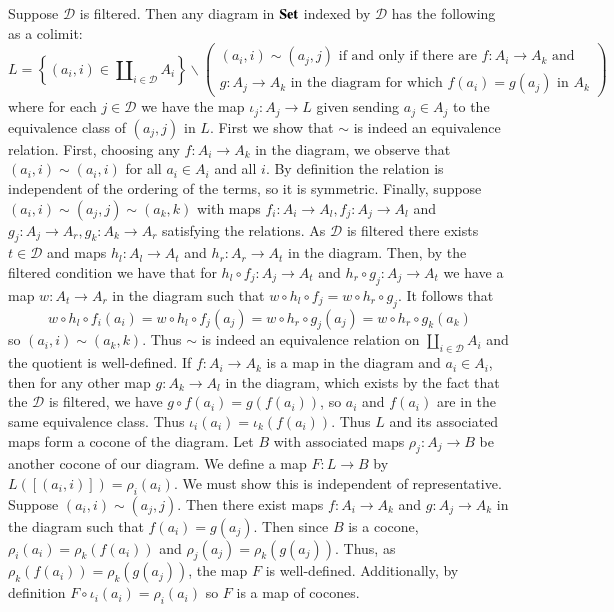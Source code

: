 \begin{example}
    Suppose $\mathscr{D}$ is filtered. Then any diagram in $\normalfont\textbf{Set}$ indexed by $\mathscr{D}$ has the following as a colimit: \begin{equation*}
        L = \left\{(a_i,i) \in \amalg_{i \in \mathscr{D}}A_i\right\}\backslash\left(\begin{array}{c} (a_i,i)\sim (a_j,j)\text{ if and only if there are } f:A_i\rightarrow A_k \text{ and } \\ g:A_j\rightarrow A_k\text{ in the diagram for which $f(a_i) = g(a_j)$ in $A_k$}\end{array}\right)
    \end{equation*}
    where for each $j \in \mathscr{D}$ we have the map $\iota_j:A_j\rightarrow L$ given sending $a_j \in A_j$ to the equivalence class of $(a_j,j)$ in $L$. First we show that $\sim$ is indeed an equivalence relation. First, choosing any $f:A_i\rightarrow A_k$ in the diagram, we observe that $(a_i,i) \sim (a_i,i)$ for all $a_i \in A_i$ and all $i$. By definition the relation is independent of the ordering of the terms, so it is symmetric. Finally, suppose $(a_i,i)\sim(a_j,j)\sim(a_k,k)$ with maps $f_i:A_i\rightarrow A_l,f_j:A_j\rightarrow A_l$ and $g_j:A_j\rightarrow A_r,g_k:A_k\rightarrow A_r$ satisfying the relations. As $\mathscr{D}$ is filtered there exists $t \in \mathscr{D}$ and maps $h_l:A_l\rightarrow A_t$ and $h_r:A_r\rightarrow A_t$ in the diagram. Then, by the filtered condition we have that for $h_l\circ f_j:A_j\rightarrow A_t$ and $h_r\circ g_j:A_j\rightarrow A_t$ we have a map $w:A_t\rightarrow A_r$ in the diagram such that $w\circ h_l\circ f_j = w\circ h_r\circ g_j$. It follows that \begin{equation*}
        w\circ h_l\circ f_i(a_i) = w\circ h_l\circ f_j(a_j) = w\circ h_r\circ g_j(a_j) = w\circ h_r\circ g_k(a_k)
    \end{equation*}
    so $(a_i,i)\sim(a_k,k)$. Thus $\sim$ is indeed an equivalence relation on $\amalg_{i \in \mathscr{D}}A_i$ and the quotient is well-defined. If $f:A_i\rightarrow A_k$ is a map in the diagram and $a_i \in A_i$, then for any other map $g:A_k\rightarrow A_l$ in the diagram, which exists by the fact that the $\mathscr{D}$ is filtered, we have $g\circ f(a_i) = g(f(a_i))$, so $a_i$ and $f(a_i)$ are in the same equivalence class. Thus $\iota_i(a_i) = \iota_k(f(a_i))$. Thus $L$ and its associated maps form a cocone of the diagram. Let $B$ with associated maps $\rho_j:A_j\rightarrow B$ be another cocone of our diagram. We define a map $F:L\rightarrow B$ by $L([(a_i,i)]) = \rho_i(a_i)$. We must show this is independent of representative. Suppose $(a_i,i)\sim(a_j,j)$. Then there exist maps $f:A_i\rightarrow A_k$ and $g:A_j\rightarrow A_k$ in the diagram such that $f(a_i) = g(a_j)$. Then since $B$ is a cocone, $\rho_i(a_i) = \rho_k(f(a_i))$ and $\rho_j(a_j) = \rho_k(g(a_j))$. Thus, as $\rho_k(f(a_i)) = \rho_k(g(a_j))$, the map $F$ is well-defined. Additionally, by definition $F\circ \iota_i(a_i) = \rho_i(a_i)$ so $F$ is a map of cocones.


\end{example}
